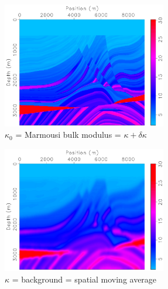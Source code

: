\documentclass[xcolor=dvipsnames,12pt,aspectratio=169]{beamer}
\begin{document}
\begin{frame}
\vspace{-0.5cm}
\begin{center}
\includegraphics[height=5.5cm]{Fig/fine1bulk}\\
$\kappa_0$ = Marmousi bulk modulus = $\kappa + \delta \kappa$
\end{center}
\vspace{-0.5cm}
\end{frame}

\begin{frame}
\vspace{-0.5cm}
\begin{center}
\includegraphics[height=5.5cm]{Fig/fine1bulkbig}\\
$\kappa$ = background = spatial moving average 
\end{center}
\vspace{-0.5cm}
\end{frame}
\end{document}
